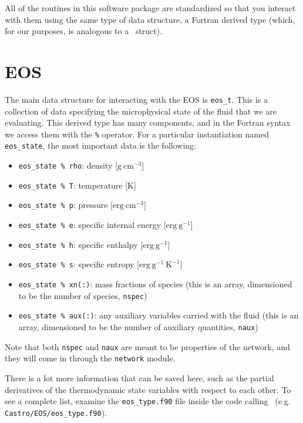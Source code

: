 \label{sec:data_structures}

All of the routines in this software package are standardized so that
you interact with them using the same type of data structure, a
Fortran derived type (which, for our purposes, is analogous to a
\cpp\ struct).

\section{EOS}

The main data structure for interacting with the EOS is {\tt eos\_t}.
This is a collection of data specifying the microphysical state of the
fluid that we are evaluating.  This derived type has many components,
and in the Fortran syntax we access them with the {\tt \%} operator. For a
particular instantiation named {\tt eos\_state}, the most important
data is the following:
\begin{itemize}
  \item {\tt eos\_state \% rho}: density [$\mathrm{g~cm^{-3}}$]

  \item {\tt eos\_state \% T}: temperature [K]

  \item {\tt eos\_state \% p}: pressure [$\mathrm{erg~cm^{-3}}$]

  \item {\tt eos\_state \% e}: specific internal energy [$\mathrm{erg~g^{-1}}$]

  \item {\tt eos\_state \% h}: specific enthalpy [$\mathrm{erg~g^{-1}}$]

  \item {\tt eos\_state \% s}: specific entropy [$\mathrm{erg~g^{-1}~K^{-1}}$]

  \item {\tt eos\_state \% xn(:)}: mass fractions of species (this is an
    array, dimensioned to be the number of species, {\tt nspec})

  \item {\tt eos\_state \% aux(:)}: any auxiliary variables carried with
    the fluid (this is an array, dimensioned to be the number of 
    auxiliary quantities, {\tt naux})
\end{itemize}
Note that both {\tt nspec} and {\tt naux} are meant to be properties of the
network, and they will come in through the {\tt network} module.

There is a lot more information that can be saved here, such as the
partial derivatives of the thermodynamic state variables with respect
to each other. To see a complete list, examine the {\tt eos\_type.f90}
file inside the code calling \microphysics\ (e.g. {\tt
  Castro/EOS/eos\_type.f90}).


